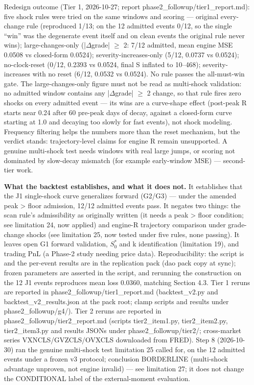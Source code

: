 \documentclass[11pt]{article}
\begin{document}
Redesign outcome (Tier 1, 2026-10-27; report phase2\_followup/tier1\_report.md): five shock rules were tried on the same windows and scoring --- original every-change rule (reproduced 1/13; on the 12 admitted events 0/12, so the single “win” was the degenerate event itself and on clean events the original rule never wins); large-changes-only (|$\Delta$grade| $\geq$ 2: 7/12 admitted, mean engine MSE 0.0508 vs closed-form 0.0524); severity-increases-only (5/12, 0.0737 vs 0.0524); no-clock-reset (0/12, 0.2393 vs 0.0524, final S inflated to 10--468); severity-increases with no reset (6/12, 0.0532 vs 0.0524). No rule passes the all-must-win gate. The large-changes-only figure must not be read as multi-shock validation: no admitted window contains any |$\Delta$grade| $\geq$ 2 change, so that rule fires zero shocks on every admitted event --- its wins are a curve-shape effect (post-peak R starts near 0.24 after 60 pre-peak days of decay, against a closed-form curve starting at 1.0 and decaying too slowly for fast events), not shock modeling. Frequency filtering helps the numbers more than the reset mechanism, but the verdict stands: trajectory-level claims for engine R remain unsupported. A genuine multi-shock test needs windows with real large jumps, or scoring not dominated by slow-decay mismatch (for example early-window MSE) --- second-tier work.

\textbf{What the backtest establishes, and what it does not.} It establishes that the J1 single-shock curve generalizes forward (G2/G3) --- under the amended peak > floor admission, 12/12 admitted events pass. It negates two things: the scan rule's admissibility as originally written (it needs a peak > floor condition; see limitation 24, now applied) and engine-R trajectory comparison under grade-change shocks (see limitation 25, now tested under five rules, none passing). It leaves open G1 forward validation, $S_0^*$ and k identification (limitation 19), and trading PnL (a Phase-2 study needing price data). Reproducibility: the script is  and the per-event results are  in the replication pack (dao pack copy at sync); frozen parameters are asserted in the script, and rerunning the construction on the 12 J1 events reproduces mean loss 0.0360, matching Section 4.3. Tier 1 reruns are reported in phase2\_followup/tier1\_report.md (backtest\_v2.py and backtest\_v2\_results.json at the pack root; clamp scripts and results under phase2\_followup/g4/). Tier 2 reruns are reported in phase2\_followup/tier2\_report.md (scripts tier2\_item1.py, tier2\_item2.py, tier2\_item3.py and results JSONs under phase2\_followup/tier2/; cross-market series VXNCLS/GVZCLS/OVXCLS downloaded from FRED). Step 8 (2026-10-30) ran the genuine multi-shock test limitation 25 called for, on the 12 admitted events under a frozen v3 protocol; conclusion BORDERLINE (multi-shock advantage unproven, not engine invalid) --- see limitation 27; it does not change the CONDITIONAL label of the external-moment evaluation.
\end{document}

